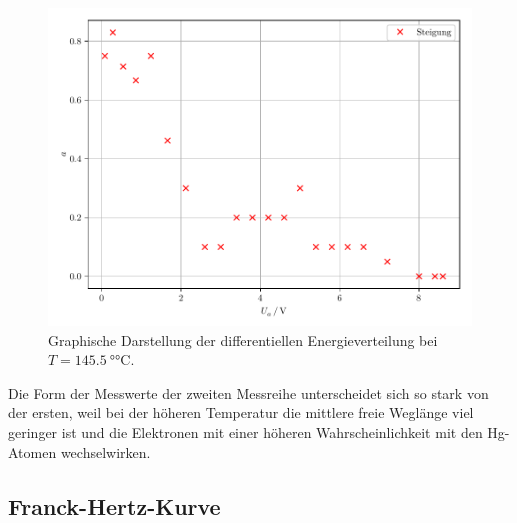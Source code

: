 \begin{figure}[H]
  \includegraphics[width=\textwidth]{plot2.pdf}
  \caption{Graphische Darstellung der differentiellen Energieverteilung bei $T = \SI{145.5}{\degree\celsius}$.}
  \label{abb:4}
\end{figure}

Die Form der Messwerte der zweiten Messreihe unterscheidet sich so stark von der
ersten, weil bei der höheren Temperatur die mittlere freie Weglänge viel geringer ist
und die Elektronen mit einer höheren Wahrscheinlichkeit mit den Hg-Atomen wechselwirken.

\subsection{Franck-Hertz-Kurve}
